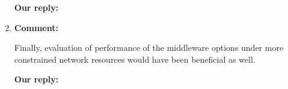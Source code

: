 \documentclass{article}
\begin{document}
\begin{enumerate}
  \begin{flushleft}
    \textbf{Our reply:}
  \end{flushleft}

\item \begin{flushleft}
    \textbf{Comment:}
  \end{flushleft}
  Finally, evaluation of performance of the middleware options under more constrained network resources would have been beneficial as well.

  \begin{flushleft}
    \textbf{Our reply:}
  \end{flushleft}

\end{enumerate}

\newpage
\end{document}
